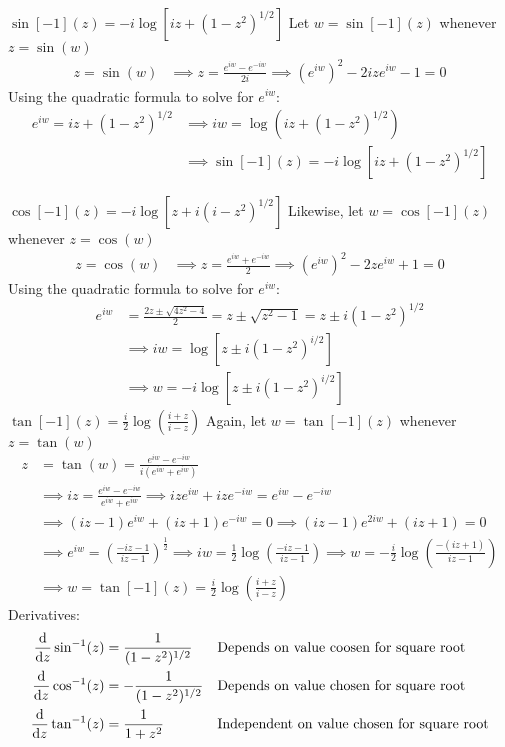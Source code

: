 \documentclass[12pt, english]{book}
\makeatletter
\renewenvironment{proof}[1][\proofname]{\par
	\pushQED{\qed}%
	\normalfont \topsep6\p@\@plus6\p@\relax
	\list{}{%
		\settowidth{\leftmargin}{\itshape\proofname:\hskip\labelsep}%
		\setlength{\labelwidth}{0pt}%
		\setlength{\itemindent}{-\leftmargin}%
	}%
	\item[\hskip\labelsep\itshape#1\@addpunct{:}]\ignorespaces
}{%
	\popQED\endlist\@endpefalse
}
\makeatother
\begin{document}
	\begin{proof}
	\underline{\(\sin[-1](z) = -i \log[iz + (1-z^2)^{1/2}] \)} \newline
	Let \(w = \sin[-1](z)\) whenever \(z = \sin(w)\)
	\begin{align*}
		z = \sin(w)
		&\implies z = \frac{e^{iw} - e^{-iw}}{2i}
		 \implies (e^{iw})^2 - 2iz e^{iw} - 1 = 0
	\end{align*}
	Using the quadratic formula to solve for \(e^{iw}\): 
	\begin{align*}
		e^{iw} = iz + (1 - z^2)^{1/2} 
		&\implies iw = \log\left( iz + (1 - z^2)^{1/2} \right) \\
		&\implies \sin[-1](z) = -i \log\left[ iz + (1 - z^2)^{1/2} \right]
	\end{align*}

	\underline{\(\cos[-1](z) = -i \log[z + i(i-z^2)^{1/2}]\)} \newline
	{\color{Grey}
	Likewise, let \(w = \cos[-1](z)\) whenever \(z = \cos(w)\)
	\begin{align*}
		z = \cos(w)
		&\implies z = \frac{e^{iw} + e^{-iw}}{2}
		 \implies (e^{iw})^2 - 2ze^{iw} + 1 = 0
	\end{align*}
	Using the quadratic formula to solve for \(e^{iw}\): 
	\begin{align*}
		e^{iw} 
		&= \frac{2z \pm \sqrt{4z^2 - 4}}{2} = z \pm \sqrt{z^2 - 1} = z \pm i (1-z^2)^{1/2} \\
		&\implies iw = \log\left[z \pm i(1-z^2)^{i/2}\right] \\
		&\implies  w = -i\log\left[z \pm i(1-z^2)^{i/2}\right] 
	\end{align*}
	}
	\underline{\(\tan[-1](z) = \frac{i}{2} \log\left(\frac{i + z}{i - z}\right)\)} \newline
	{\color{Grey}
	Again, let \(w = \tan[-1](z)\) whenever \(z = \tan(w)\)
	\begin{align*}
		z &= \tan(w) = \frac{e^{iw} - e^{-iw}}{i(e^{iw} + e^{iw})} \\
		&\implies iz = \frac{e^{iw} - e^{-iw}}{e^{iw} + e^{iw}}
		\implies iz e^{iw} + iz e^{-iw} = e^{iw} - e^{-iw} \\
		&\implies (iz - 1)e^{iw} + (iz + 1)e^{-iw} = 0 
		\implies (iz - 1)e^{2iw} + (iz + 1) = 0 \\
		&\implies e^{iw} = \left(\frac{-iz - 1}{iz - 1}\right)^\frac{1}{2} 
		 \implies iw = \frac{1}{2} \log\left(\frac{-iz - 1}{iz - 1}\right) 
	 	 \implies w = -\frac{i}{2} \log\left(\frac{-(iz + 1)}{iz - 1}\right) \\
		&\implies w = \tan[-1](z) = \frac{i}{2} \log\left(\frac{i + z}{i - z}\right)
	\end{align*}
	}
	\end{proof}
	Derivatives:
	\begin{align*}
		\dv{z} \sin[-1](z) &= \frac{1}{(1-z^2)^{1/2}}
			& &\text{Depends on value coosen for square root} \\
		\dv{z} \cos[-1](z) &= -\frac{1}{(1-z^2)^{1/2}}
			& &\text{Depends on value chosen for square root} \\
		\dv{z} \tan[-1](z) &= \frac{1}{1 + z^2}
			& &\text{Independent on value chosen for square root}
	\end{align*}
\end{document}
